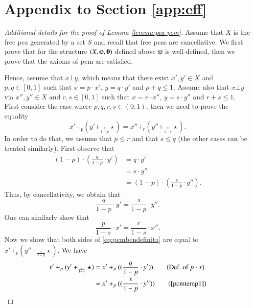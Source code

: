 \section{Appendix to Section \ref{app:eff}}\label{app:app:eff}

\begin{proof}[Additional details for the proof of Lemma \ref{lemma:pca-pcm}]
    Assume that $X$ is the free pca generated by a set $S$ and recall that free pcas are cancellative. We first prove that for the structure $(X,\circledvee,\zeropcm)$ defined above $\circledvee$ is well-defined, then we prove that the axioms of pcm are satisfied.
    
    Hence, assume that $x\bot y$, which means that there exist $x',y'\in X$ and $p,q\in [0,1]$ such that $x=p\cdot x'$, $y=q\cdot y'$ and $p+q\leq 1$. Assume also that $x\bot y$ via $x'',y''\in X$ and $r,s\in [0,1]$ such that $x=r\cdot x''$, $y=s\cdot y''$ and $r+s\leq 1$. First consider the case where $p,q,r,s\in(0,1)$, then we need to prove the equality
\begin{equation}\label{eq:pcmbendefinita}
    x'+_p(y'+_{\frac{q}{1-p}}\star) = x''+_r(y''+_{\frac{s}{1-r}}\star)\text{.}\end{equation}
In order to do that, we assume that $p\leq r$ and that $s\leq q$ (the other cases can be treated similarly).
First observe that 
\begin{align*}
    (1-p)\cdot (\frac{q}{1-p}\cdot y') & = q\cdot y' \\
    &= s\cdot y'' \tag{Hypothesis}\\
    & = (1-p)\cdot (\frac{s}{1-p}\cdot y'')\text{.}
    \end{align*}
    Thus, by cancellativity, we obtain that 
    \begin{equation}\tag{$\dagger$}\label{pcmtemp1}
    \frac{q}{1-p}\cdot y' = \frac{s}{1-p}\cdot y''.
    \end{equation}
     One can similarly show that 
     \begin{equation}\tag{$\ddagger$}\label{pcmtemp2}
     \frac{p}{1-s}\cdot x'=\frac{r}{1-s}\cdot x''.
     \end{equation}
    Now we show that both sides of \eqref{eq:pcmbendefinita} are equal to $x'+_p(y''+_{\frac{s}{1-p}}\star)$. We have %
\begin{align*}
    x'+_p(y'+_{\frac{q}{1-p}}\star) & = x'+_p((\frac{q}{1-p}\cdot y')) \tag{Def.\ of $p\cdot x$}\\
    & = x'+_p((\frac{s}{1-p}\cdot y'')) \tag{\ref{pcmtemp1}}\\

\end{align*}
\end{proof}
